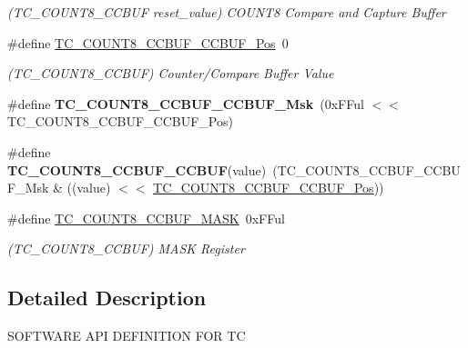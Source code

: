 \begin{DoxyCompactItemize}
\begin{DoxyCompactList}\small\item\em (T\+C\+\_\+\+C\+O\+U\+N\+T8\+\_\+\+C\+C\+B\+U\+F reset\+\_\+value) C\+O\+U\+N\+T8 Compare and Capture Buffer \end{DoxyCompactList}\item 
\hypertarget{group___s_a_m_l21___t_c_gabf88c718b564ae7ec524ce843e95a884}{}\#define \hyperlink{group___s_a_m_l21___t_c_gabf88c718b564ae7ec524ce843e95a884}{T\+C\+\_\+\+C\+O\+U\+N\+T8\+\_\+\+C\+C\+B\+U\+F\+\_\+\+C\+C\+B\+U\+F\+\_\+\+Pos}~0\label{group___s_a_m_l21___t_c_gabf88c718b564ae7ec524ce843e95a884}

\begin{DoxyCompactList}\small\item\em (T\+C\+\_\+\+C\+O\+U\+N\+T8\+\_\+\+C\+C\+B\+U\+F) Counter/\+Compare Buffer Value \end{DoxyCompactList}\item 
\hypertarget{group___s_a_m_l21___t_c_ga79e13cf193209f8800550242dce04b5f}{}\#define {\bfseries T\+C\+\_\+\+C\+O\+U\+N\+T8\+\_\+\+C\+C\+B\+U\+F\+\_\+\+C\+C\+B\+U\+F\+\_\+\+Msk}~(0x\+F\+Ful $<$$<$ T\+C\+\_\+\+C\+O\+U\+N\+T8\+\_\+\+C\+C\+B\+U\+F\+\_\+\+C\+C\+B\+U\+F\+\_\+\+Pos)\label{group___s_a_m_l21___t_c_ga79e13cf193209f8800550242dce04b5f}

\item 
\hypertarget{group___s_a_m_l21___t_c_gaed9de66138456db3833ed92162cf934d}{}\#define {\bfseries T\+C\+\_\+\+C\+O\+U\+N\+T8\+\_\+\+C\+C\+B\+U\+F\+\_\+\+C\+C\+B\+U\+F}(value)~(T\+C\+\_\+\+C\+O\+U\+N\+T8\+\_\+\+C\+C\+B\+U\+F\+\_\+\+C\+C\+B\+U\+F\+\_\+\+Msk \& ((value) $<$$<$ \hyperlink{group___s_a_m_l21___t_c_gabf88c718b564ae7ec524ce843e95a884}{T\+C\+\_\+\+C\+O\+U\+N\+T8\+\_\+\+C\+C\+B\+U\+F\+\_\+\+C\+C\+B\+U\+F\+\_\+\+Pos}))\label{group___s_a_m_l21___t_c_gaed9de66138456db3833ed92162cf934d}

\item 
\hypertarget{group___s_a_m_l21___t_c_ga4c6e27ac9a494b3078f657a66a75e123}{}\#define \hyperlink{group___s_a_m_l21___t_c_ga4c6e27ac9a494b3078f657a66a75e123}{T\+C\+\_\+\+C\+O\+U\+N\+T8\+\_\+\+C\+C\+B\+U\+F\+\_\+\+M\+A\+S\+K}~0x\+F\+Ful\label{group___s_a_m_l21___t_c_ga4c6e27ac9a494b3078f657a66a75e123}

\begin{DoxyCompactList}\small\item\em (T\+C\+\_\+\+C\+O\+U\+N\+T8\+\_\+\+C\+C\+B\+U\+F) M\+A\+S\+K Register \end{DoxyCompactList}\end{DoxyCompactItemize}


\subsection{Detailed Description}
S\+O\+F\+T\+W\+A\+R\+E A\+P\+I D\+E\+F\+I\+N\+I\+T\+I\+O\+N F\+O\+R T\+C 